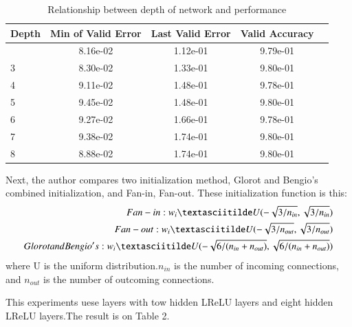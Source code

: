 \documentclass{article}
\begin{document}
\begin{table}[tb]
\vskip 3mm
\begin{center}
\begin{small}
\begin{sc}
\begin{tabular}{lcccr}
\hline
\abovespace\belowspace
Depth & Min of Valid Error & Last Valid Error & Valid Accuracy \\
\hline
\abovespace
2    & 8.16e-02 & 1.12e-01 & 9.79e-01\\
3    & 8.30e-02 & 1.33e-01 & 9.80e-01\\
4    & 9.11e-02 & 1.48e-01 &  9.78e-01\\
5    & 9.45e-02 & 1.48e-01 & 9.80e-01\\
6    & 9.27e-02 & 1.66e-01 & 9.78e-01\\
7    & 9.38e-02 & 1.74e-01 & 9.80e-01\\
8    & 8.88e-02 & 1.74e-01 & 9.80e-01\\

\hline
\end{tabular}
\end{sc}
\end{small}
\caption{Relationship between depth of network and performance}
\label{tab:sample-table}
\end{center}
\vskip -3mm
\end{table}

Next, the author compares two initialization method, Glorot and Bengio's combined initialization, and Fan-in, Fan-out.
These initialization function is this:
\begin{equation}
  \begin{split}
  Fan-in: w_i \textasciitilde U(-\sqrt{3/n_{in}}, \sqrt{3/n_{in}}) \\
  Fan-out: w_i \textasciitilde U(-\sqrt{3/n_{out}}, \sqrt{3/n_{out}}) \\
  Glorot and Bengio's: w_i \textasciitilde U(-\sqrt{6/(n_{in}+n_{out})}, \sqrt{6/(n_{in}+n_{out})}) \\
  \end{split}
\end{equation}
where U is the uniform distribution.$n_{in}$ is the number of incoming connections, and $n_{out}$ is the number of outcoming connections.

This experiments uese layers with tow hidden LReLU layers and eight hidden LReLU layers.The result is on Table 2.
\end{document}
